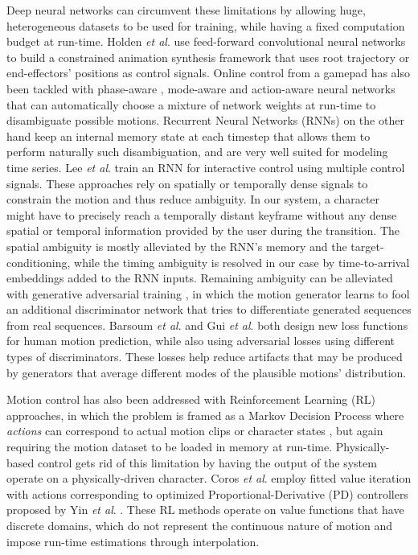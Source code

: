 \documentclass[acmtog]{acmart}
\newcommand{\etal}{\textit{et al}. }
\begin{document}
Deep neural networks can circumvent these limitations by allowing huge, heterogeneous datasets to be used for training, while having a fixed computation budget at run-time. Holden \etal {} use feed-forward convolutional neural networks to build a constrained animation synthesis framework that uses root trajectory or end-effectors' positions as control signals. Online control from a gamepad has also been tackled with phase-aware \cite{holden2017phase}, mode-aware \cite{zhang2018mode} and action-aware \cite{starke2019neural} neural networks that can automatically choose a mixture of network weights at run-time to disambiguate possible motions.
Recurrent Neural Networks (RNNs) on the other hand keep an internal memory state at each timestep that allows them to perform naturally such disambiguation, and are very well suited for modeling time series. Lee \etal {} train an RNN for interactive control using multiple control signals. These approaches \cite{holden2016deep, holden2017phase, zhang2018mode, lee2018interactive} rely on spatially or temporally dense signals to constrain the motion and thus reduce ambiguity. In our system, a character might have to precisely reach a temporally distant keyframe without any dense spatial or temporal information provided by the user during the transition. The spatial ambiguity is mostly alleviated by the RNN's memory and the target-conditioning, while the timing ambiguity is resolved in our case by time-to-arrival embeddings added to the RNN inputs. Remaining ambiguity can be alleviated with generative adversarial training \cite{goodfellow2014generative}, in which the motion generator learns to fool an additional discriminator network that tries to differentiate generated sequences from real sequences. 
Barsoum \etal {} and Gui \etal {} both design new loss functions for human motion prediction, while also using adversarial losses using different types of discriminators. These losses help reduce artifacts that may be produced by generators that average different modes of the plausible motions' distribution.


Motion control has also been addressed with Reinforcement Learning (RL) approaches, in which the problem is framed as a Markov Decision Process where \textit{actions} can correspond to actual motion clips \cite{lee2006precomputing, treuille2007near} or character states \cite{lee2010motion}, but again requiring the motion dataset to be loaded in memory at run-time. Physically-based control gets rid of this limitation by having the output of the system operate on a physically-driven character. Coros \etal {} employ fitted value iteration with actions corresponding to optimized Proportional-Derivative (PD) controllers proposed by Yin \etal {}. These RL methods operate on value functions that have discrete domains, which do not represent the continuous nature of motion and impose run-time estimations through interpolation. 
\end{document}
